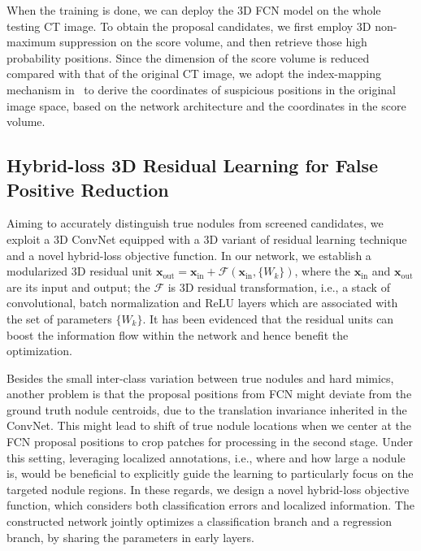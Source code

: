 \documentclass{llncs}
\begin{document}
When the training is done, we can deploy the 3D FCN model on the whole testing CT image.
To obtain the proposal candidates, we first employ 3D non-maximum suppression on the score volume, and then retrieve those high probability positions.
Since the dimension of the score volume is reduced compared with that of the original CT image, we adopt the index-mapping mechanism in~\cite{dou2016automatic} to derive the coordinates of suspicious positions in the original image space, based on the network architecture and the coordinates in the score volume.


\subsection{Hybrid-loss 3D Residual Learning for False Positive Reduction}

Aiming to accurately distinguish true nodules from screened candidates,
we exploit a 3D ConvNet equipped with a 3D variant of residual learning technique~\cite{he2016identity} and a novel hybrid-loss objective function.
In our network, we establish a modularized 3D residual unit $\bm{x}_{\text{out}} = \bm{x}_{\text{in}} + \mathcal{F} (\bm{x}_{\text{in}}, \{W_{k}\})$, where the $\bm{x}_{\text{in}}$ and $\bm{x}_{\text{out}}$ are its input and output; the $\mathcal{F}$ is 3D residual transformation, i.e., a stack of convolutional, batch normalization and ReLU layers which are associated with the set of parameters $\{W_{k}\}$.
It has been evidenced that the residual units can boost the information flow within the network and hence benefit the optimization.

Besides the small inter-class variation between true nodules and hard mimics, another problem is that the proposal positions from FCN might deviate from the ground truth nodule centroids, due to the translation invariance inherited in the ConvNet.
This might lead to shift of true nodule locations when we center at the FCN proposal positions to crop patches for processing in the second stage.
Under this setting, leveraging localized annotations, i.e., where and how large a nodule is, would be beneficial to explicitly guide the learning to particularly focus on the targeted nodule regions.
In these regards, we design a novel hybrid-loss objective function, which considers both classification errors and localized information.
The constructed network jointly optimizes a classification branch and a regression branch, by sharing the parameters in early layers.
\end{document}
